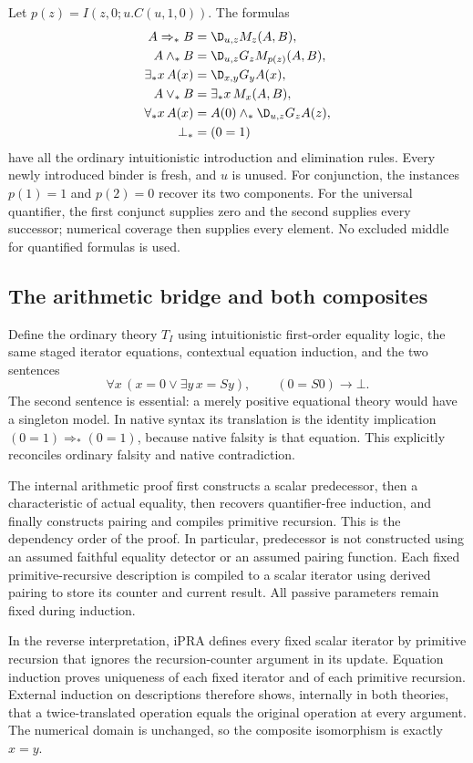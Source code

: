 Let $p(z)=I(z,0;u.C(u,1,0))$. The formulas
\[
\begin{aligned}
 A\Rightarrow_*B&=\D_{u,z}M_z(A,B),\\
 A\wedge_*B&=\D_{u,z}G_zM_{p(z)}(A,B),\\
 \exists_*x\,A(x)&=\D_{x,y}G_yA(x),\\
 A\vee_*B&=\exists_*x\,M_x(A,B),\\
 \forall_*x\,A(x)&=A(0)\wedge_*\D_{u,z}G_zA(z),\\
 \bot_*&=(0=1)
\end{aligned}
\]
have all the ordinary intuitionistic introduction and elimination
rules. Every newly introduced binder is fresh, and $u$ is unused.
For conjunction, the instances $p(1)=1$ and $p(2)=0$ recover its two
components. For the universal quantifier, the first conjunct supplies
zero and the second supplies every successor; numerical coverage then
supplies every element. No excluded middle for quantified formulas is
used.

\subsection{The arithmetic bridge and both composites}

Define the ordinary theory $T_I$ using intuitionistic first-order equality
logic, the same staged iterator equations, contextual equation induction,
and the two sentences
\[
 \forall x\,(x=0\vee\exists y\,x=Sy),\qquad (0=S0)\to\bot.
\]
The second sentence is essential: a merely positive equational theory
would have a singleton model. In native syntax its translation is the
identity implication $(0=1)\Rightarrow_*(0=1)$, because native falsity is
that equation. This explicitly reconciles ordinary falsity and native
contradiction.

The internal arithmetic proof first constructs a scalar predecessor, then
a characteristic of actual equality, then recovers quantifier-free
induction, and finally constructs pairing and compiles primitive recursion.
This is the dependency order of the proof. In particular, predecessor
is not constructed using an assumed faithful equality detector or an
assumed pairing function. Each fixed primitive-recursive description is
compiled to a scalar iterator using derived pairing to store its counter
and current result. All passive parameters remain fixed during induction.

In the reverse interpretation, iPRA defines every fixed scalar iterator
by primitive recursion that ignores the recursion-counter argument in its
update. Equation induction proves uniqueness of each fixed iterator and
of each primitive recursion. External induction on descriptions therefore
shows, internally in both theories, that a twice-translated operation
equals the original operation at every argument. The numerical domain is
unchanged, so the composite isomorphism is exactly $x=y$.

